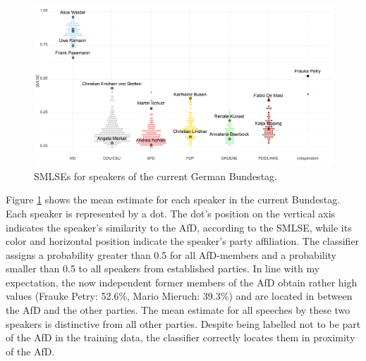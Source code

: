 \documentclass{article}
\begin{document}
\begin{figure}
    \centering
    \includegraphics[width=\textwidth]{DE/vis/DE_speakers.png}
    \caption{SMLSEs for speakers of the current German Bundestag.}
    \label{fig:speakers}
\end{figure}


Figure \ref{fig:speakers} shows the mean estimate for each speaker in the current Bundestag. Each speaker is represented by a dot. The dot's position on the vertical axis indicates the speaker's similarity to the AfD, according to the SMLSE, while its color and horizontal position indicate the speaker's party affiliation. The classifier assigns a probability greater than 0.5 for all AfD-members and a probability smaller than 0.5 to all speakers from established parties. In line with my expectation, the now independent former members of the AfD obtain rather high values (Frauke Petry: 52.6\%, Mario Mieruch: 39.3\%) and are located in between the AfD and the other parties. The mean estimate for all speeches by these two speakers is distinctive from all other parties. Despite being labelled not to be part of the AfD in the training data, the classifier correctly locates them in proximity of the AfD. \par
\end{document}
